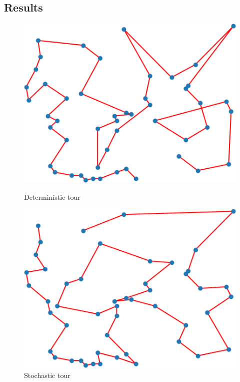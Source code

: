 \documentclass[12pt]{article}
\begin{document}
\subsection{Results}

\newpage
\begin{figure}[H]
\centering
\begin{minipage}{.45\textwidth}
  \centering
  \includegraphics[width=.75\linewidth]{images/p2_det_1}
  \caption{Deterministic tour}
  \label{fig:p2_det_1}
\end{minipage}\hfill
\begin{minipage}{.45\textwidth}
  \centering
  \includegraphics[width=.75\linewidth]{images/p2_stoch_1}
  \caption{Stochastic tour}
  \label{fig:p2_stoch_1}
\end{minipage}
\end{figure}
\end{document}
